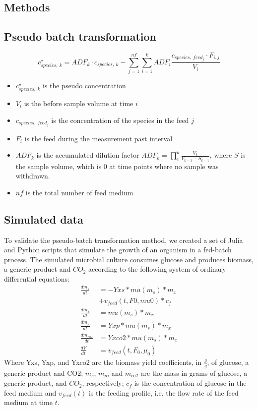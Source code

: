 \documentclass{bioinfo}
\begin{document}
\begin{methods}
\section{Methods}
\subsection{Pseudo batch transformation}
\begin{equation}\label{eq:transformation}
c^{\star}_{species,\: k} = ADF_k \cdot c_{species, \: k} - \sum_{j=1}^{nf} \sum_{i=1}^{k}ADF_i\frac{c_{species, \: feed_{j}} \cdot F_{i,j}}{V_i}
\end{equation}
\begin{itemize}
    \item $c^{\star}_{species,\: k}$ is the pseudo concentration
    \item $V_i$ is the before sample volume at time $i$
    \item $c_{species, \: feed_{j}}$ is the concentration of the species in the feed $j$
    \item $F_i$ is the feed during the measurement past interval
    \item $ADF_k$ is the accumulated dilution factor $ADF_k = \prod_1^k\frac{V_k}{V_{k-1} - S_{k-1}}$, where $S$ is the sample volume, which is 0 at time points where no sample was withdrawn.
    \item $nf$ is the total number of feed medium
\end{itemize}


\subsection{Simulated data}
To validate the pseudo-batch transformation method, we created a set of Julia \cite{bezansonJuliaFreshApproach2017} and Python \cite{rossumPythonLanguageReference2010} scripts that simulate the growth of an organism in a fed-batch process. The simulated microbial culture consumes glucose and produces biomass, a generic product and $CO_2$ according to the following system of ordinary differential equations:
\begin{align} %
\frac{dm_{s}}{dt} &= -Yxs * mu(m_{s}) * m_{x} \\ &+ v_{feed}(t, F0, mu0) * c_f \\
\frac{dm_{x}}{dt} &= mu(m_{s}) * m_{x} \\
\frac{dm_{p}}{dt} &= Yxp * mu(m_{s}) * m_{x} \\
\frac{dm_{co2}}{dt} &= Yxco2 * mu(m_{s}) * m_{x} \\
\frac{dV}{dt} &= v_{feed}(t, F_0, \mu_0)
\end{align}
Where Yxs, Yxp, and Yxco2 are the biomass yield coefficients, in $\frac{g}{g}$, of glucose, a generic product and CO2; $m_{s}$, $m_{p}$, and $m_{co2}$ are the mass in grams of glucose, a generic product, and $CO_2$, respectively; $c_f$ is the concentration of glucose in the feed medium and $v_{feed}(t)$ is the feeding profile, i.e. the flow rate of the feed medium at time $t$. 


\end{methods}
\end{document}
